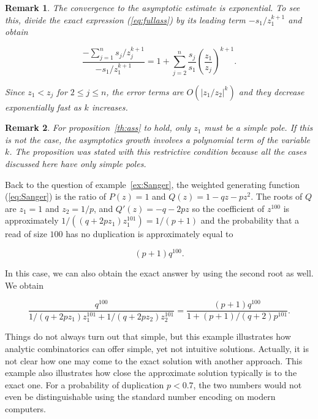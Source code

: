\documentclass{article}
\newtheorem{remark}{Remark}
\begin{document}
\begin{remark}
The convergence to the asymptotic estimate is exponential. To see this,
divide the exact expression (\ref{eq:fullass}) by its leading term
$-s_1/z_1^{k+1}$ and obtain

\begin{equation*}
\frac{-\sum_{j=1}^n s_j/z_j^{k+1}}{-s_1/z_1^{k+1}} = 1 + \sum_{j=2}^n
\frac{s_j}{s_1} \left( \frac{z_1}{z_j} \right)^{k+1}.
\end{equation*}

Since $z_1 < z_j$ for $2 \leq j \leq n$, the error terms are
$O(|z_1/z_2|^k)$ and they decrease exponentially fast as $k$ increases.
\end{remark}

\begin{remark}
For proposition~\ref{th:ass} to hold, only $z_1$ must be a simple pole. If
this is not the case, the asymptotics growth involves a polynomial term of
the variable $k$. The proposition was stated with this restrictive
condition because all the cases discussed here have only simple poles.
\end{remark}

Back to the question of example~\ref{ex:Sanger}, the weighted generating
function (\ref{eq:Sanger}) is the ratio of $P(z) = 1$ and $Q(z) =
1-qz-pz^2$. The roots of $Q$ are $z_1 = 1$ and $z_2 = 1/p$, and $Q'(z) =
-q -2pz$ so the coefficient of $z^{100}$ is approximately
$1/((q+2pz_1)z_1^{101}) = 1/(p+1)$ and the probability that a read of size
$100$ has no duplication is approximately equal to

\begin{equation*}
(p+1)q^{100}.
\end{equation*}

In this case, we can also obtain the exact answer by using the second root
as well. We obtain

\begin{equation*}
\frac{q^{100}}{1/(q+2pz_1)z_1^{101} + 1/(q+2pz_2)z_2^{101}} =
\frac{(p+1)q^{100}}{1+(p+1)/(q+2)p^{101}}.
\end{equation*}

Things do not always turn out that simple, but this example illustrates
how analytic combinatorics can offer simple, yet not intuitive solutions.
Actually, it is not clear how one may come to the exact solution with
another approach. This example also illustrates how close the approximate
solution typically is to the exact one. For a probability of duplication
$p < 0.7$, the two numbers would not even be distinguishable using the
standard number encoding on modern computers.
\end{document}
